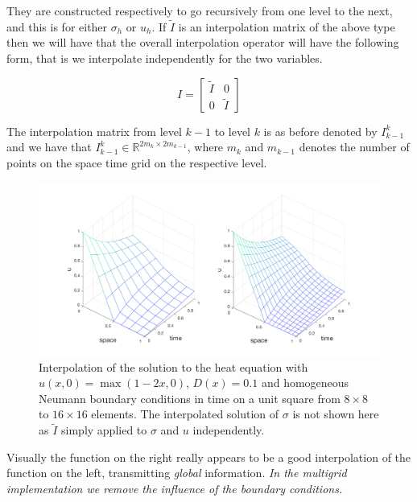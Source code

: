 \documentclass[../draft_1.tex]{subfiles}
\begin{document}
They are constructed respectively to go recursively from one level to the next, and this is for either $\sigma_h$ or $u_h$. If $\tilde{I}$ is an interpolation matrix of the above type then we will have that the overall interpolation operator will have the following form, that is we interpolate independently for the two variables. 
\begin{ceqn}
	\begin{equation}
	I = \begin{bmatrix}
	\tilde{I} & 0 \\
	0 & 	\tilde{I}
	\end{bmatrix}
	\end{equation}
\end{ceqn}

The interpolation matrix from level $k-1$ to level $k$ is as before denoted by $I_{k-1}^k$ and we have that  $I_{k-1}^k \in \mathbb{R}^{2m_k \times 2m_{k-1}}$, where $m_k$ and $m_{k-1}$ denotes the number of points on the space time grid on the respective level. 

\begin{figure}[ht!]
	\centering
	\includegraphics[scale=0.25]{images/implementation/sol_heat_eqn_interpol}
	\caption{Interpolation of the solution to the heat equation with $u(x,0) = \max(1-2x, 0)$, $D(x) = 0.1$ and homogeneous Neumann boundary conditions in time on a unit square from $8 \times 8$ to $16 \times 16$ elements. The interpolated solution of $\sigma$ is not shown here as $\tilde{I}$ simply applied to $\sigma$ and $u$ independently.}
\end{figure}

Visually the function on the right really appears to be a good interpolation of the function on the left, transmitting \textit{global} information. \textit{In the multigrid implementation we remove the influence of the boundary conditions.}
\end{document}
